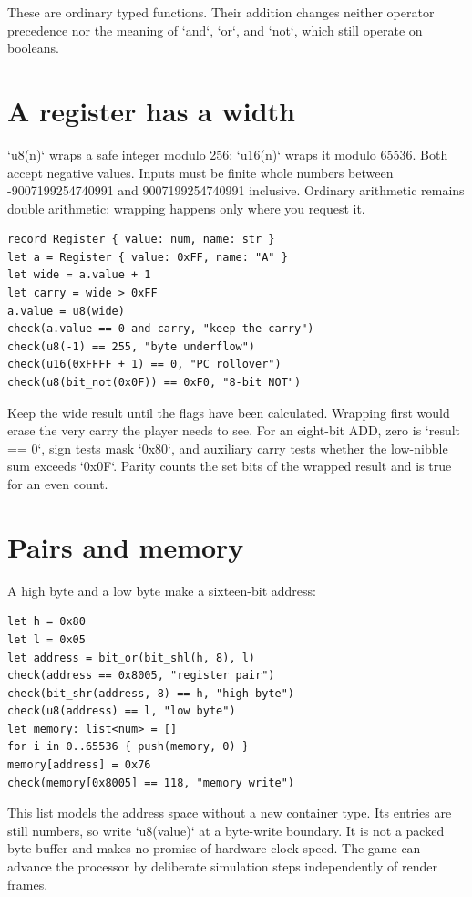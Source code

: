 These are ordinary typed functions. Their addition changes neither operator
precedence nor the meaning of `and`, `or`, and `not`, which still operate on
booleans.

\section{A register has a width}

`u8(n)` wraps a safe integer modulo 256; `u16(n)` wraps it modulo 65536.
Both accept negative values. Inputs must be finite whole numbers between
-9007199254740991 and 9007199254740991 inclusive. Ordinary arithmetic remains
double arithmetic: wrapping happens only where you request it.

\begin{lstlisting}[language=wick]
record Register { value: num, name: str }
let a = Register { value: 0xFF, name: "A" }
let wide = a.value + 1
let carry = wide > 0xFF
a.value = u8(wide)
check(a.value == 0 and carry, "keep the carry")
check(u8(-1) == 255, "byte underflow")
check(u16(0xFFFF + 1) == 0, "PC rollover")
check(u8(bit_not(0x0F)) == 0xF0, "8-bit NOT")
\end{lstlisting}

Keep the wide result until the flags have been calculated. Wrapping first
would erase the very carry the player needs to see. For an eight-bit ADD,
zero is `result == 0`, sign tests mask `0x80`, and auxiliary carry tests
whether the low-nibble sum exceeds `0x0F`. Parity counts the set bits of
the wrapped result and is true for an even count.

\section{Pairs and memory}

A high byte and a low byte make a sixteen-bit address:

\begin{lstlisting}[language=wick]
let h = 0x80
let l = 0x05
let address = bit_or(bit_shl(h, 8), l)
check(address == 0x8005, "register pair")
check(bit_shr(address, 8) == h, "high byte")
check(u8(address) == l, "low byte")
let memory: list<num> = []
for i in 0..65536 { push(memory, 0) }
memory[address] = 0x76
check(memory[0x8005] == 118, "memory write")
\end{lstlisting}

This list models the address space without a new container type. Its entries
are still numbers, so write `u8(value)` at a byte-write boundary. It is not a
packed byte buffer and makes no promise of hardware clock speed. The game
can advance the processor by deliberate simulation steps independently of
render frames.

